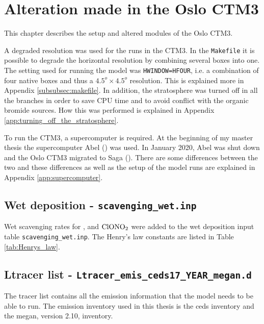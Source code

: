 \setcounter{chapter}{4}
\chapter{Alteration made in the Oslo CTM3}

This chapter describes the setup and altered modules of the Oslo CTM3. 

\medskip

A degraded resolution was used for the runs in the CTM3. In the \texttt{Makefile} it is possible to degrade the horizontal resolution by combining several boxes into one. The setting used for running the model was \texttt{HWINDOW=HFOUR}, i.e. a combination of four native boxes and thus a $4.5^o \times 4.5^o$ resolution. This is explained more in Appendix \ref{subsubsec:makefile}. In addition, the stratosphere was turned off in all the branches in order to save CPU time and to avoid conflict with the organic bromide sources. How this was performed is explained in Appendix \ref{app:turning_off_the_stratosphere}. 

\medskip

To run the CTM3, a supercomputer is required. At the beginning of my master thesis the supercomputer Abel (\cite{abel}) was used. In January 2020, Abel was shut down and the Oslo CTM3 migrated to Saga (\cite{saga}). There are some differences between the two  and these differences as well as the setup of the model runs are explained in Appendix \ref{app:supercomputer}. 


\section{Wet deposition - \texttt{scavenging\_wet.inp}}\label{sec:scav_wet}

Wet scavenging rates for ,  and $\mathrm{ClONO_2}$ were added to the wet deposition input table \texttt{scavenging\_wet.inp}. The Henry's law constants are listed in Table \ref{tab:Henrys_law}. 



 
\section{Ltracer list - \texttt{Ltracer\_emis\_ceds17\_YEAR\_megan.d}}\label{subsubsec:Ltracer_list}

The tracer list contains all the emission information that the model needs to be able to run. The emission inventory used in this thesis is the \acrlong{ceds} inventory and the \acrlong{megan}, version 2.10, inventory. 

